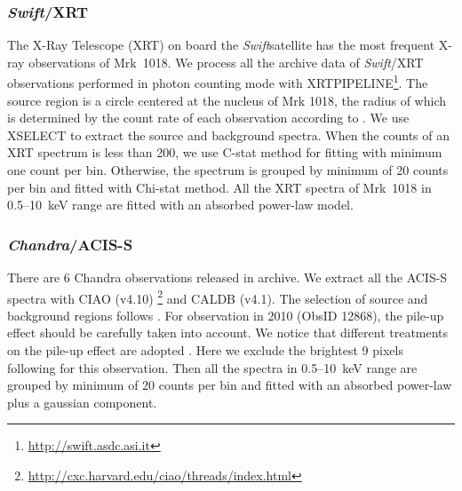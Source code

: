 \documentclass[twocolumn]{aastex63}
\newcommand{\chandra}{{\em Chandra}}
\newcommand{\swift}{{\em Swift}}
\begin{document}
\subsubsection{\swift/XRT}
The X-Ray Telescope (XRT) on board the \swift satellite has the most frequent X-ray observations of Mrk~1018. We process all the archive data of \swift/XRT observations performed in photon counting mode with {\scriptsize XRTPIPELINE}\footnote{\url{http://swift.asdc.asi.it}}. The source region is a circle centered at the nucleus of Mrk 1018, the radius of which is determined by the count rate of each observation according to \citet{2009MNRAS.397.1177E}. We use {\scriptsize XSELECT} to extract the source and background spectra. When the counts of an XRT spectrum is less than 200, we use C-stat method for fitting with minimum one count per bin. Otherwise, the spectrum is grouped by minimum of 20 counts per bin and fitted with Chi-stat method. All the XRT spectra of Mrk~1018 in 0.5--10~keV range are fitted with an absorbed power-law model. 


\subsubsection{\chandra/ACIS-S}
There are 6 Chandra observations released in archive. We extract all the ACIS-S spectra with CIAO (v4.10) \footnote{\url{http://cxc.harvard.edu/ciao/threads/index.html}} and {\scriptsize CALDB} (v4.1). The selection of source and background regions follows \citet{2017ApJ...840...11L}. For observation in 2010 (ObsID 12868), the pile-up effect should be carefully taken into account. We notice that different treatments on the pile-up effect are adopted \citep[see ][]{2017ApJ...840...11L,2016A&A...593L...9H,2017A&A...607L...9K}. Here we exclude the brightest 9 pixels following \citet{2016A&A...593L...9H} for this observation. Then all the spectra in 0.5--10~keV range are grouped by minimum of 20 counts per bin and fitted with an absorbed power-law plus a gaussian component. 

\end{document}
